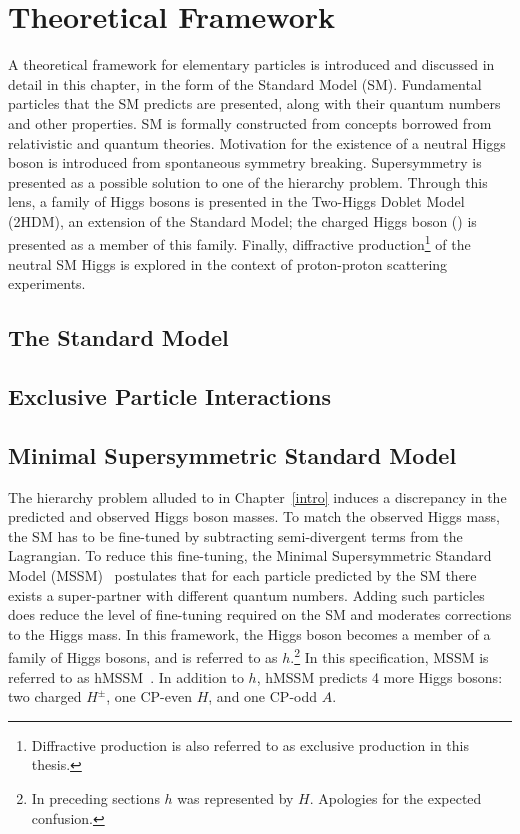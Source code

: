 \chapter{Theoretical Framework}
\begin{chapabstract}
\par A theoretical framework for elementary particles is introduced and discussed 
in detail in this chapter, in the form of the Standard Model (SM).
Fundamental particles that the SM predicts are presented, along with their quantum numbers and other properties. 
SM is formally constructed from concepts borrowed from relativistic and quantum theories.  
Motivation for the existence of a neutral Higgs boson is introduced from  
spontaneous symmetry breaking. Supersymmetry is presented as a possible solution to one of the 
hierarchy problem. Through this lens, a family of Higgs bosons is presented in 
the Two-Higgs Doblet Model (2HDM), an extension of the Standard Model; 
the charged Higgs boson (\Hpm) is presented as a member of this family. 
Finally, diffractive production\footnote{Diffractive production is also referred to as 
exclusive production in this thesis.} of the neutral SM Higgs is explored in the context of 
proton-proton scattering experiments.  
\end{chapabstract}
\label{theory}

\section{The Standard Model}
\label{sec:sm}


\section{Exclusive Particle Interactions}
\label{sec:diffPhy}

 

\section{Minimal Supersymmetric Standard Model} 
\label{sec:twohdm}
\par The hierarchy problem alluded to in Chapter~\ref{intro} induces a discrepancy in the predicted 
and observed Higgs boson masses. To match the observed Higgs mass, the SM has to be fine-tuned by 
subtracting semi-divergent terms from the Lagrangian. To reduce this fine-tuning, the 
Minimal Supersymmetric Standard Model (MSSM)~\cite{FAYET1976159} postulates that for each particle predicted by the SM 
there exists a super-partner with different quantum numbers. Adding such particles does 
reduce the level of fine-tuning required on the SM and moderates corrections to the 
Higgs mass. In this framework, the Higgs boson becomes a member of a family of Higgs 
bosons, and is referred to as $h$.\footnote{In 
preceding sections $h$ was represented by $H$. Apologies for the expected 
confusion.} In this specification, MSSM is referred to as hMSSM~\cite{Djouadi:2013uqa}.
In addition to $h$, hMSSM predicts 4 more Higgs bosons: two 
charged $H^{\pm}$, one CP-even $H$, and one CP-odd $A$. 
 
